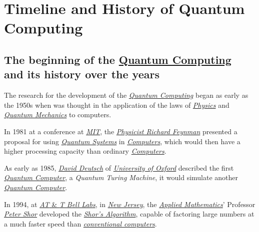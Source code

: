 \documentclass[conference]{IEEEtran}
\begin{document}
\newpage

\section{Timeline and History of Quantum Computing}

\subsection{The beginning of the \href{https://en.wikipedia.org/wiki/Quantum_computing}{Quantum Computing}\\ and its history over the years}\label{AA}

The research for the development of the \href{https://en.wikipedia.org/wiki/Quantum_computing}{\textit{Quantum Computing}} began as early as the 1950s when was thought in the application of the laws of \href{https://en.wikipedia.org/wiki/Physics}{\textit{Physics}} and \href{https://en.wikipedia.org/wiki/Quantum_mechanics}{\textit{Quantum Mechanics}} to computers.

\vspace{4pt}

In 1981 at a conference at \href{https://en.wikipedia.org/wiki/Massachusetts_Institute_of_Technology}{\textit{MIT}}, the \href{https://en.wikipedia.org/wiki/Richard_Feynman}{\textit{Physicist Richard Feynman}} presented a proposal for using \href{https://en.wikipedia.org/wiki/Quantum_system}{\textit{Quantum Systems}} in \href{https://en.wikipedia.org/wiki/Computer}{\textit{Computers}}, which would then have a higher processing capacity than ordinary \href{https://en.wikipedia.org/wiki/Computer}{\textit{Computers}}.

\vspace{4pt}

As early as 1985, \href{https://en.wikipedia.org/wiki/David_Deutsch}{\textit{David Deutsch}} of \href{https://en.wikipedia.org/wiki/University_of_Oxford}{\textit{University of Oxford}} described the first \href{https://en.wikipedia.org/wiki/Quantum_computing}{\textit{Quantum Computer}}, a \textit{Quantum Turing Machine}, it would simulate another \href{https://en.wikipedia.org/wiki/Quantum_computing}{\textit{Quantum Computer}}.

\vspace{4pt}

In 1994, at \href{https://en.wikipedia.org/wiki/Bell_Labs}{\textit{AT} \& \textit{T Bell Labs}}, in \href{https://en.wikipedia.org/wiki/New_Jersey}{\textit{New Jersey}}, the \href{https://en.wikipedia.org/wiki/Applied_mathematics}{\textit{Applied Mathematics}}' Professor \href{https://en.wikipedia.org/wiki/Peter_Shor}{\textit{Peter Shor}} developed the \href{https://en.wikipedia.org/wiki/Shor\%27s_algorithm}{\textit{Shor's Algorithm}}, capable of factoring large numbers at a much faster speed than \href{https://en.wikipedia.org/wiki/Von_Neumann_architecture}{\textit{conventional computers}}.
\end{document}
